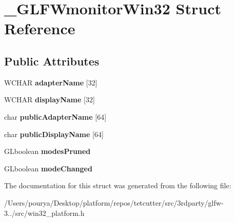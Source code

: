 \hypertarget{struct__GLFWmonitorWin32}{}\section{\+\_\+\+G\+L\+F\+Wmonitor\+Win32 Struct Reference}
\label{struct__GLFWmonitorWin32}
\subsection*{Public Attributes}
\begin{DoxyCompactItemize}
\item 
\hypertarget{struct__GLFWmonitorWin32_ad003b1afa3a98ff64933d112a13112df}{}W\+C\+H\+A\+R {\bfseries adapter\+Name} \mbox{[}32\mbox{]}\label{struct__GLFWmonitorWin32_ad003b1afa3a98ff64933d112a13112df}

\item 
\hypertarget{struct__GLFWmonitorWin32_a3f74462e12fda99819dea7b6a18d7685}{}W\+C\+H\+A\+R {\bfseries display\+Name} \mbox{[}32\mbox{]}\label{struct__GLFWmonitorWin32_a3f74462e12fda99819dea7b6a18d7685}

\item 
\hypertarget{struct__GLFWmonitorWin32_a96d5996e50b19bbe0d10651cf328906a}{}char {\bfseries public\+Adapter\+Name} \mbox{[}64\mbox{]}\label{struct__GLFWmonitorWin32_a96d5996e50b19bbe0d10651cf328906a}

\item 
\hypertarget{struct__GLFWmonitorWin32_aa3a13b43b6900876ac1c1aa89d5fb2bb}{}char {\bfseries public\+Display\+Name} \mbox{[}64\mbox{]}\label{struct__GLFWmonitorWin32_aa3a13b43b6900876ac1c1aa89d5fb2bb}

\item 
\hypertarget{struct__GLFWmonitorWin32_ae1ccfcc862636d1867e3ebc388a97623}{}G\+Lboolean {\bfseries modes\+Pruned}\label{struct__GLFWmonitorWin32_ae1ccfcc862636d1867e3ebc388a97623}

\item 
\hypertarget{struct__GLFWmonitorWin32_a18b0e2496dbf5e08d23a42ead0ab68f9}{}G\+Lboolean {\bfseries mode\+Changed}\label{struct__GLFWmonitorWin32_a18b0e2496dbf5e08d23a42ead0ab68f9}

\end{DoxyCompactItemize}


The documentation for this struct was generated from the following file\+:\begin{DoxyCompactItemize}
\item 
/\+Users/pourya/\+Desktop/platform/repos/tetcutter/src/3rdparty/glfw-\/3../src/win32\+\_\+platform.\+h\end{DoxyCompactItemize}
